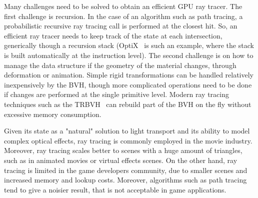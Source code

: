 Many challenges need to be solved to obtain an efficient GPU ray tracer. The first challenge is recursion. In the case of an algorithm such as path tracing, a probabilistic recursive ray tracing call is performed at the closest hit. So, an efficient ray tracer needs to keep track of the state at each intersection, generically though a recursion stack (OptiX~\cite{Parker2010} is such an example, where the stack is built automatically at the instruction level). The second challenge is on how to manage the data structure if the geometry of the material changes, through deformation or animation. Simple rigid transformations can be handled relatively inexpensively by the BVH, though more complicated operations need to be done if  changes are performed at the single primitive level. Modern ray tracing techniques such as the TRBVH~\cite{Karras2013} can rebuild part of the BVH on the fly without excessive memory consumption. 

Given its state as a "natural" solution to light transport and its ability to model complex optical effects, ray tracing is commonly employed in the movie industry. Moreover, ray tracing scales better to scenes with a huge amount of triangles, such as in animated movies or virtual effects scenes. On the other hand, ray tracing is limited in the game developers community, due to smaller scenes and increased memory and lookup costs. Moreover, algorithms such as path tracing tend to give a noisier result, that is not acceptable in game applications. 


